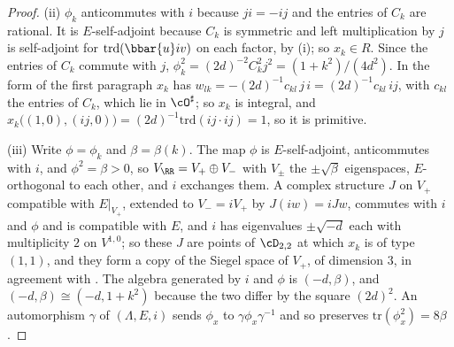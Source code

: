 \begin{proof}
(ii) $\phi_{k}$ anticommutes with $i$ because $ji=-ij$ and the entries of
$C_{k}$ are rational. It is $E$-self-adjoint because $C_{k}$ is symmetric and
left multiplication by $j$ is self-adjoint for $\mathrm{trd}(\bbar{u}iv)$ on
each factor, by (i); so $x_{k}\in R$. Since the entries of
$C_{k}$ commute with $j$, $\phi_{k}^{2}=(2d)^{-2}C_{k}^{2}j^{2}=(1+k^{2})/(4d^{2})$.
In the form of the first paragraph $x_{k}$ has
$w_{lk}=-(2d)^{-1}c_{kl}\,j\,i=(2d)^{-1}c_{kl}\,ij$, with $c_{kl}$ the entries of
$C_{k}$, which lie in $\cO^{\sharp}$; so $x_{k}$ is integral, and
$x_{k}\bigl((1,0),(ij,0)\bigr)=(2d)^{-1}\mathrm{trd}(ij\cdot ij)=1$, so it is
primitive.

(iii) Write $\phi=\phi_{k}$ and $\beta=\beta(k)$. The map $\phi$ is
$E$-self-adjoint, anticommutes with $i$, and $\phi^{2}=\beta>0$, so
$V_{\RR}=V_{+}\oplus V_{-}$ with $V_{\pm}$ the $\pm\sqrt{\beta}$ eigenspaces,
$E$-orthogonal to each other, and $i$ exchanges them. A complex structure $J$
on $V_{+}$ compatible with $E|_{V_{+}}$, extended to $V_{-}=iV_{+}$ by
$J(iw)=iJw$, commutes with $i$ and $\phi$ and is compatible with $E$, and $i$
has eigenvalues $\pm\sqrt{-d}$ each with multiplicity $2$ on $V^{1,0}$; so
these $J$ are points of $\cD_{2,2}$ at which $x_{k}$ is of type $(1,1)$, and
they form a copy of the Siegel space of $V_{+}$, of dimension $3$, in
agreement with . The algebra generated by $i$ and $\phi$
is $(-d,\beta)$, and $(-d,\beta)\cong(-d,1+k^{2})$ because the two differ by
the square $(2d)^{2}$. An automorphism $\gamma$ of $(\Lambda,E,i)$ sends
$\phi_{x}$ to $\gamma\phi_{x}\gamma^{-1}$ and so preserves
$\mathrm{tr}(\phi_{x}^{2})=8\beta$.


\end{proof}
